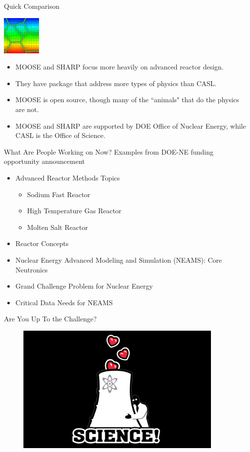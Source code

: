 \documentclass[xcolor=x11names]{beamer}
\begin{document}
\begin{frame}{Quick Comparison}
\begin{center}
\includegraphics[height=0.75in,clip]{moose}
\end{center}
\begin{itemize}
\item MOOSE and SHARP focus more heavily on advanced reactor design.
\item They have package that address more types of physics than CASL.
\item MOOSE is open source, though many of the ``animals" that do the physics are not.
\item MOOSE and SHARP are supported by DOE Office of Nuclear Energy, while CASL is the Office of Science.
\end{itemize}
\end{frame}


\begin{frame}{What Are People Working on Now?}
Examples from DOE-NE funding opportunity announcement
\begin{itemize}
\item Advanced Reactor Methods Topics
  \begin{itemize}
  \item Sodium Fast Reactor
  \item High Temperature Gas Reactor
  \item Molten Salt Reactor
  \end{itemize}
\item Reactor Concepts
\item Nuclear Energy Advanced Modeling and Simulation (NEAMS): Core Neutronics
\item Grand Challenge Problem for Nuclear Energy
\item Critical Data Needs for NEAMS
\end{itemize}

\end{frame}


\begin{frame}{Are You Up To the Challenge?}
\begin{figure}
\includegraphics[height=2.5in,clip]{science}
\end{figure}
\end{frame}
\end{document}
